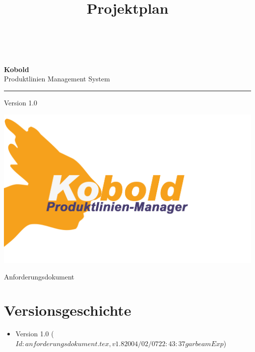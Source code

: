 \documentclass[a4paper,titlepage,12pt,ngerman]{scrbook}
\title {\huge \product\\[0.5cm]\large Projektplan \\[0.5cm] \version
  \\[1cm] \Large \company}
\newcommand\version{Version 1.0\xspace}
\begin{document}

\begin{titlepage}
\renewcommand{\thefootnote}{\fnsymbol{footnote}}
{\Huge
\raggedright
\textbf{\bf Kobold} \\
\huge Produktlinien Management System
\rule{\textwidth}{0.75pt}
\par
}
\begin{flushleft}
\normalsize
\version
\end{flushleft}

\vspace*{3cm}
\begin{center}
\includegraphics[width=15cm]{../common/logo-color.png}
\end{center}
\vfill

{\parindent=0cm
\Huge Anforderungsdokument
}


\setcounter{footnote}{0}
\end{titlepage}


\section*{Versionsgeschichte}

\begin{itemize}

\item Version 1.0  ($Id: anforderungsdokument.tex,v 1.8 2004/02/07 22:43:37 garbeam Exp $)


\end{itemize}


\tableofcontents




\appendix

\end{document}
